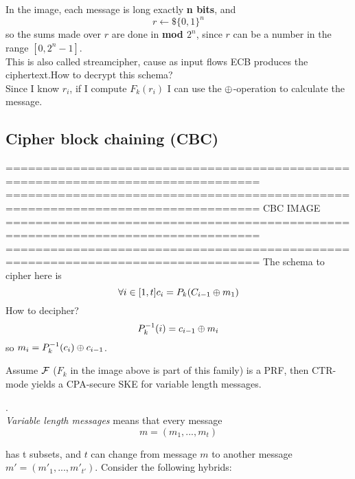 In the image, each message is long exactly \textbf{n bits}, and 
\[
r \leftarrow\$ \{0,1\}^{n} 
\]
so the sums made over $r$ are done in \textbf{mod $2^{n}$}, since $r$ can be a
number in the range $[0, 2^{n} -1]$.\\

This is also called streamcipher, cause as input flows ECB produces the
ciphertext.How to decrypt this schema?\\
Since I know $r_{i}$, if I compute $F_{k}(r_{i})$ I can use the $\oplus$-operation
to calculate the message.\\

\subsection{Cipher block chaining (CBC)}
================================================================================
================================================================================
                    CBC IMAGE
================================================================================
================================================================================
The schema to cipher here is 
\[ 
    \forall i \in [1,t] c_{i}=P_{k}(C_{i-1}\oplus m_{1})
\]
How to decipher?
\[
    P_{k}^{-1}(i)= c_{i-1} \oplus m_{i}
\]
so $m_{i}= P_{k}^{-1}(c_{i}) \oplus c_{i-1}$.\\

\begin{theorem}
    Assume $\mathcal{F}$ ($F_{k}$ in the image above is part of this family) is a PRF,
    then CTR-mode yields a CPA-secure SKE for variable length messages.
\end{theorem}.\\
\textit{Variable length messages}  means that  every message 
\[
    m=(m_{1}, ..., m_{t})
\]

has t subsets, and $t$ can change from message $m$ to another message
$m'=(m'_{1}, ..., m'_{t'})$.
Consider the following hybrids:

